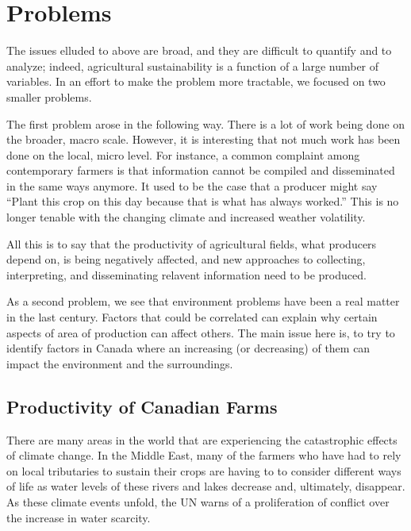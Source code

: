 \documentclass[11pt]{article}
\numberwithin{equation}{section}
\begin{document}
 
\section{Problems}\label{problems}

The issues elluded to above are broad, and they are difficult to quantify and to analyze; indeed, agricultural sustainability is a function of a large number of variables. In an effort to make the problem more tractable, we focused on two smaller problems.

The first problem arose in the following way. There is a lot of work being done on the broader, macro scale. However, it is interesting that not much work has been done on the local, micro level. For instance, a common complaint among contemporary farmers is that information cannot be compiled and disseminated in the same ways anymore. It used to be the case that a producer might say ``Plant this crop on this day because that is what has always worked.'' This is no longer tenable with the changing climate and increased weather volatility.

All this is to say that the productivity of agricultural fields, what producers depend on, is being negatively affected, and new approaches to collecting, interpreting, and disseminating relavent information need to be produced.

As a second problem, we see that environment problems  have been a real matter in the last century. Factors that could be correlated can explain why certain aspects of area of production can affect others. The main issue here is,  to try to identify  factors in  Canada where an increasing (or decreasing) of them can  impact the environment and the surroundings. 


\subsection{Productivity of Canadian Farms}\label{productivity}

There are many areas in the world that are experiencing the catastrophic effects of climate change. In the Middle East, many of the farmers who have had to rely on local tributaries to sustain their crops are having to to consider different ways of life as water levels of these rivers and lakes decrease and, ultimately, disappear. As these climate events unfold, the UN \cite{UN} warns of a proliferation of conflict over the increase in water scarcity.
\end{document}
